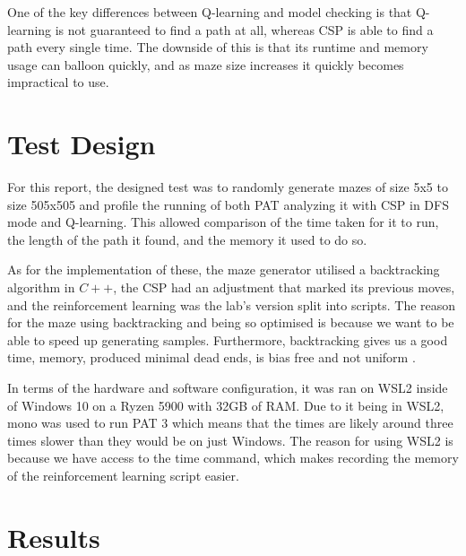 \documentclass{article}
\newcommand\tab[1][1cm]{\hspace*{#1}}
\begin{document}
        \tab One of the key differences between Q-learning and model checking is 
        that Q-learning is not guaranteed to find a path at all, whereas CSP 
        is able to find a path every single time. The downside of this is 
        that its runtime and memory usage can balloon quickly, and as maze 
        size increases it quickly becomes impractical to use.

    \section{Test Design}\label{sec:test-design}
        For this report, the designed test was to randomly generate mazes of 
        size 5x5 to size 505x505 and profile the running of both PAT analyzing 
        it with CSP in DFS mode and Q-learning. This allowed comparison of 
        the time taken for it to run, the length of the path it found, and 
        the memory it used to do so.

        \tab As for the implementation of these, the maze generator utilised a
        backtracking algorithm in $C++$, the CSP had an adjustment that marked its
        previous moves, and the reinforcement learning was the lab's version
        split into scripts. The reason for the maze using backtracking and being
        so optimised is because we want to be able to speed up generating
        samples. Furthermore, backtracking gives us a good time, memory,
        produced minimal dead ends, is bias free and not uniform 
        \cite{source}.

        \tab In terms of the hardware and software configuration, it was ran on
        WSL2 inside of Windows 10 on a Ryzen 5900 with 32GB of RAM. Due to it
        being in WSL2, mono was used to run PAT 3 which means that the times are
        likely around three times slower than they would be on just Windows. 
        The reason for using WSL2 is because we have access to the time command,
        which makes recording the memory of the reinforcement learning script
        easier. 

    \newpage
    \section{Results}\label{sec:results}

        \begin{table}[ht!]
            \resizebox{\textwidth}{!}{
                
            }
        \end{table}
        \newpage
\end{document}
